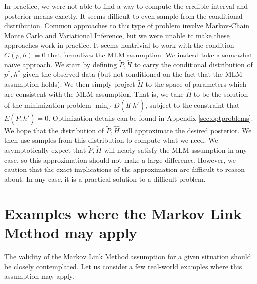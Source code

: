 In practice, we were not able to find a way to compute the credible interval and posterior means exactly.  It seems difficult to even sample from the conditional distribution.  Common approaches to this type of problem involve Markov-Chain Monte Carlo and Variational Inference, but we were unable to make these approaches work in practice.  It seems nontrivial to work with the condition $G(p,h)=0$ that formalizes the MLM assumption.  We instead take a somewhat na\"ive approach.  We start by defining $\tilde P,\tilde H$ to carry the conditional distribution of $p^*,h^*$ given the observed data (but not conditioned on the fact that the MLM assumption holds).  We then simply project $\tilde H$ to the space of parameters which are consistent with the MLM assumption.  That is, we take $\hat H$ to be the solution of the minimization problem $\min_{h'}D(\tilde H|h')$, subject to the constraint that $E(\tilde P,h')=0$.  Optimization details can be found in Appendix \ref{sec:optproblems}.  We hope that the distribution of $\tilde P,\hat H$ will approximate the desired posterior.  We then use samples from this distribution to compute what we need.  We asymptotically expect that $\tilde P,\tilde H$ will nearly satisfy the MLM assumption in any case, so this approximation should not make a large difference.  However, we caution that the exact implications of the approximation are difficult to reason about.   In any case, it is a practical solution to a difficult problem.


\section{Examples where the Markov Link Method may apply}

\label{sec:examples}

The validity of the Markov Link Method assumption for a given situation should be closely contemplated.  Let us consider a few real-world examples where this assumption may apply.

